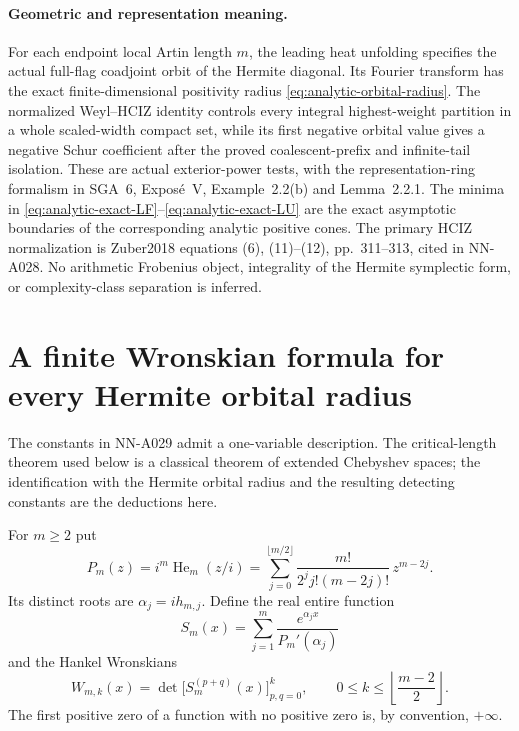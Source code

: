 \paragraph{Geometric and representation meaning.}
For each endpoint local Artin length $m$, the leading heat unfolding
specifies the actual full-flag coadjoint orbit of the Hermite diagonal.
Its Fourier transform has the exact finite-dimensional positivity
radius \eqref{eq:analytic-orbital-radius}. The normalized Weyl--HCIZ
identity controls every integral highest-weight partition in a whole
scaled-width compact set, while its first negative orbital value gives
a negative Schur coefficient after the proved coalescent-prefix and
infinite-tail isolation. These are actual exterior-power tests, with
the representation-ring formalism in SGA~6, Expos\'e~V, Example~2.2(b)
and Lemma~2.2.1. The minima in
\eqref{eq:analytic-exact-LF}--\eqref{eq:analytic-exact-LU} are the exact
asymptotic boundaries of the corresponding analytic positive cones.
The primary HCIZ normalization is Zuber2018 equations (6), (11)--(12),
pp.~311--313, cited in NN-A028. No arithmetic Frobenius object,
integrality of the Hermite symplectic form, or complexity-class
separation is inferred.


\section{A finite Wronskian formula for every Hermite orbital radius}
\label{sec:analytic-orbital-wronskians}

The constants in NN-A029 admit a one-variable description. The
critical-length theorem used below is a classical theorem of extended
Chebyshev spaces; the identification with the Hermite orbital radius
and the resulting detecting constants are the deductions here.

For $m\ge2$ put
\begin{equation}\label{eq:analytic-hermite-ode}
 P_m(z)=i^m\operatorname{He}_m(z/i)
 =\sum_{j=0}^{\lfloor m/2\rfloor}
       \frac{m!}{2^j j!(m-2j)!}\,z^{m-2j}.
\end{equation}
Its distinct roots are $\alpha_j=ih_{m,j}$. Define the real entire
function
\begin{equation}\label{eq:analytic-fundamental-solution}
 S_m(x)=\sum_{j=1}^m\frac{e^{\alpha_jx}}{P_m'(\alpha_j)}
\end{equation}
and the Hankel Wronskians
\begin{equation}\label{eq:analytic-finite-wronskians}
 W_{m,k}(x)=\det\bigl[S_m^{(p+q)}(x)\bigr]_{p,q=0}^k,
 \qquad 0\le k\le\left\lfloor\frac{m-2}{2}\right\rfloor.
\end{equation}
The first positive zero of a function with no positive zero is, by
convention, $+\infty$.

